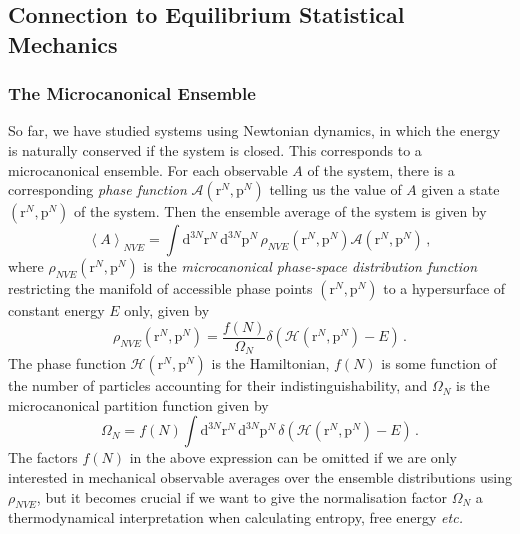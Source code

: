 \documentclass{article}
\theoremstyle{plain}\theoremheaderfont{\normalfont\itshape}\theorembodyfont{\rmfamily}\theoremseparator{.}\newtheorem*{rem}{Remark}\newtheorem*{ex}{Example}\newtheorem*{proof}{Proof}\newtheorem*{altp}{Alternative proof}
\theoremstyle{plain}\theoremheaderfont{\normalfont\bfseries}\theorembodyfont{\rmfamily}\theoremseparator{.}\newtheorem{thm}{Theorem}[section]\newtheorem{lem}[thm]{Lemma}\newtheorem{prop}[thm]{Proposition}\newtheorem*{cor}{Corollary}\newtheorem{defn}[thm]{Definition}\newtheorem{clm}[thm]{Claim}\newtheorem{clminproof}{Claim}\newtheorem{alg}[thm]{Algorithm}\newtheorem{hyp}[thm]{Hypothesis}\newtheorem{law}[thm]{Law}
\theoremstyle{break}\theoremheaderfont{\normalfont\itshape}\theorembodyfont{\rmfamily}\theoremseparator{.\medskip}\newtheorem*{proofskip}{Proof}\newtheorem*{exs}{Examples}\newtheorem*{rems}{Remarks}
\theoremstyle{break}\theoremheaderfont{\normalfont\bfseries}\theorembodyfont{\rmfamily}\theoremseparator{.\medskip}\newtheorem{lemskip}[thm]{Lemma}\newtheorem{defnskip}[thm]{Definition}\newtheorem{propskip}[thm]{Proposition}\newtheorem{thmskip}[thm]{Theorem}
\numberwithin{equation}{section}
\newcommand{\dd}[2][]{\mathrm{d}^{#1} #2\,}
\newcommand{\eval}[1]{\left\langle #1 \right\rangle}
\newcommand{\vb}[1]{\bm{\mathrm{#1}}}
\begin{document}
    \subsection{Connection to Equilibrium Statistical Mechanics}
    \subsubsection{The Microcanonical Ensemble}
    So far, we have studied systems using Newtonian dynamics, in which the energy is naturally conserved if the system is closed. This corresponds to a microcanonical ensemble. For each observable \(A\) of the system, there is a corresponding \textit{phase function} \(\mathcal{A}(\vb{r}^N,\vb{p}^N)\) telling us the value of \(A\) given a state \((\vb{r}^N,\vb{p}^N)\) of the system. Then the ensemble average of the system is given by
    \begin{equation}\label{microcanonical_average}
        \eval{A}_{NVE}=\int\dd[3N]{\vb{r}^N}\dd[3N]{\vb{p}^N}\rho_{NVE}(\vb{r}^N,\vb{p}^N)\mathcal{A}(\vb{r}^N,\vb{p}^{N})\,,
    \end{equation}
    where \(\rho_{NVE}(\vb{r}^N,\vb{p}^N)\) is the \textit{microcanonical phase-space distribution function} restricting the manifold of accessible phase points \((\vb{r}^N,\vb{p}^N)\) to a hypersurface of constant energy \(E\) only, given by
    \begin{equation}
        \rho_{NVE}(\vb{r}^N,\vb{p}^N)=\frac{f(N)}{\Omega_N}\delta(\mathcal{H}(\vb{r}^N,\vb{p}^N)-E)\,.
    \end{equation}
    The phase function \(\mathcal{H}(\vb{r}^N,\vb{p}^N)\) is the Hamiltonian, \(f(N)\) is some function of the number of particles accounting for their indistinguishability, and \(\Omega_N\) is the microcanonical partition function given by
    \begin{equation}
        \Omega_N=f(N)\int\dd[3N]{\vb{r}^N}\dd[3N]{\vb{p}^N}\delta(\mathcal{H}(\vb{r}^N,\vb{p}^N)-E)\,.
    \end{equation}
    The factors \(f(N)\) in the above expression can be omitted if we are only interested in mechanical observable averages over the ensemble distributions using \(\rho_{NVE}\), but it becomes crucial if we want to give the normalisation factor \(\Omega_N\) a thermodynamical interpretation when calculating entropy, free energy \textit{etc.}
\end{document}
